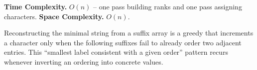\begin{complexitybox}
\textbf{Time Complexity.} $O(n)$ -- one pass building ranks and one pass
assigning characters. \textbf{Space Complexity.} $O(n)$.
\end{complexitybox}

\begin{takeawaybox}
Reconstructing the minimal string from a suffix array is a greedy that
increments a character only when the following suffixes fail to already
order two adjacent entries. This ``smallest label consistent with a given
order'' pattern recurs whenever inverting an ordering into concrete values.
\end{takeawaybox}

